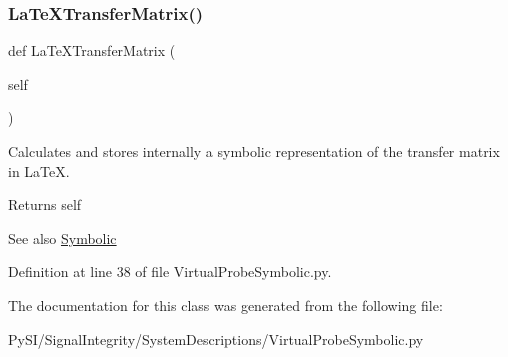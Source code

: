 \mbox{\label{classSignalIntegrity_1_1SystemDescriptions_1_1VirtualProbeSymbolic_1_1VirtualProbeSymbolic_adc83c150e43916083e3379cd4b9bb80e}} 
\subsubsection{\texorpdfstring{La\+Te\+X\+Transfer\+Matrix()}{LaTeXTransferMatrix()}}
{\footnotesize\ttfamily def La\+Te\+X\+Transfer\+Matrix (\begin{DoxyParamCaption}\item[{}]{self }\end{DoxyParamCaption})}



Calculates and stores internally a symbolic representation of the transfer matrix in La\+TeX. 

\begin{DoxyReturn}{Returns}
self 
\end{DoxyReturn}
\begin{DoxySeeAlso}{See also}
\hyperlink{namespaceSignalIntegrity_1_1SystemDescriptions_1_1Symbolic}{Symbolic} 
\end{DoxySeeAlso}


Definition at line 38 of file Virtual\+Probe\+Symbolic.\+py.



The documentation for this class was generated from the following file\+:\begin{DoxyCompactItemize}
\item 
Py\+S\+I/\+Signal\+Integrity/\+System\+Descriptions/Virtual\+Probe\+Symbolic.\+py\end{DoxyCompactItemize}
